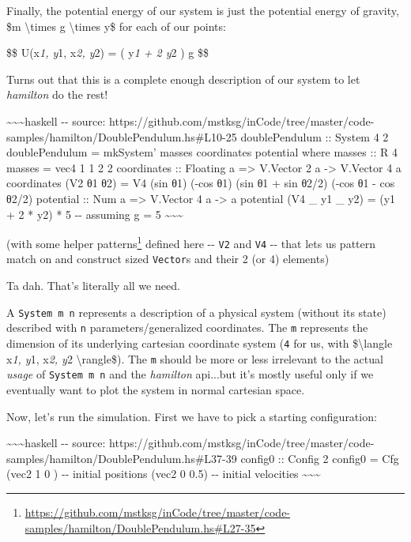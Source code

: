 \documentclass[]{article}
\renewcommand{\href}[2]{#2\footnote{\url{#1}}}
\begin{document}
Finally, the potential energy of our system is just the potential energy of
gravity, \$m \textbackslash{}times g \textbackslash{}times y\$ for each of our
points:

\$\$ U(x\emph{1, y}1, x\emph{2, y}2) = ( y\emph{1 + 2 y}2 ) g \$\$

Turns out that this is a complete enough description of our system to let
\emph{hamilton} do the rest!

\textasciitilde{}\textasciitilde{}\textasciitilde{}haskell -\/- source:
https://github.com/mstksg/inCode/tree/master/code-samples/hamilton/DoublePendulum.hs\#L10-25
doublePendulum :: System 4 2 doublePendulum = mkSystem' masses coordinates
potential where masses :: R 4 masses = vec4 1 1 2 2 coordinates :: Floating a
=\textgreater{} V.Vector 2 a -\textgreater{} V.Vector 4 a coordinates (V2 θ1 θ2)
= V4 (sin θ1) (-cos θ1) (sin θ1 + sin θ2/2) (-cos θ1 - cos θ2/2) potential ::
Num a =\textgreater{} V.Vector 4 a -\textgreater{} a potential (V4 \_ y1 \_ y2)
= (y1 + 2 * y2) * 5 -\/- assuming g = 5
\textasciitilde{}\textasciitilde{}\textasciitilde{}

(with some
\href{https://github.com/mstksg/inCode/tree/master/code-samples/hamilton/DoublePendulum.hs\#L27-35}{helper
patterns} defined here -\/- \texttt{V2} and \texttt{V4} -\/- that lets us
pattern match on and construct sized \texttt{Vector}s and their 2 (or 4)
elements)

Ta dah. That's literally all we need.

A \texttt{System\ m\ n} represents a description of a physical system (without
its state) described with \texttt{n} parameters/generalized coordinates. The
\texttt{m} represents the dimension of its underlying cartesian coordinate
system (\texttt{4} for us, with \$\textbackslash{}langle x\emph{1, y}1,
x\emph{2, y}2 \textbackslash{}rangle\$). The \texttt{m} should be more or less
irrelevant to the actual \emph{usage} of \texttt{System\ m\ n} and the
\emph{hamilton} api...but it's mostly useful only if we eventually want to plot
the system in normal cartesian space.

Now, let's run the simulation. First we have to pick a starting configuration:

\textasciitilde{}\textasciitilde{}\textasciitilde{}haskell -\/- source:
https://github.com/mstksg/inCode/tree/master/code-samples/hamilton/DoublePendulum.hs\#L37-39
config0 :: Config 2 config0 = Cfg (vec2 1 0 ) -\/- initial positions (vec2 0
0.5) -\/- initial velocities \textasciitilde{}\textasciitilde{}\textasciitilde{}
\end{document}
